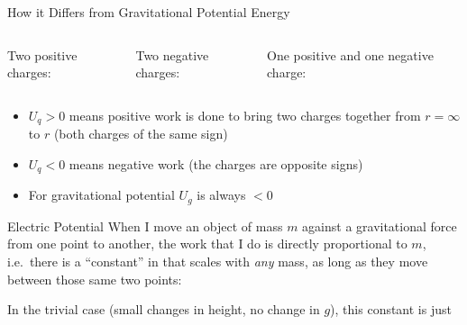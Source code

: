 \documentclass[12pt,aspectratio=169]{beamer}
\newcommand{\eq}[2]{\vspace{#1}{
    \Large\begin{displaymath}#2\end{displaymath}}
}
\begin{document}
\begin{frame}{How it Differs from Gravitational Potential Energy}
  \begin{columns}
    \begin{center}
      Two positive charges:

      \eq{-.3in}{U_q>0}
    \end{center}
    
    \begin{center}
      Two negative charges:

      \eq{-.3in}{U_q>0}
    \end{center}
    
    \begin{center}
      One positive and one negative charge:

      \eq{-.5in}{U_q<0}
    \end{center}
  \end{columns}

  \vspace{.2in}
  \begin{itemize}
  \item $U_q>0$ means positive work is done to bring two charges together from
   $r=\infty$ to $r$ (both charges of the same sign)
  \item $U_q<0$ means negative work (the charges are opposite signs)
  \item For gravitational potential $U_g$ is always $<0$
  \end{itemize}
\end{frame}



\begin{frame}{Electric Potential}
  When I move an object of mass $m$ against a gravitational force from one
  point to another, the work that I do is directly proportional to $m$, i.e.\
  there is a ``constant'' in that scales with \emph{any} mass, as long as they
  move between those same two points:

  \eq{-.2in}{
    W=\Delta U_g=Km
  }

  In the trivial case (small changes in height, no change in $g$), this
  constant is just

  \eq{-.2in}{
    \frac{\Delta U_g}{m}=g\Delta h
  }
\end{frame}
\end{document}
